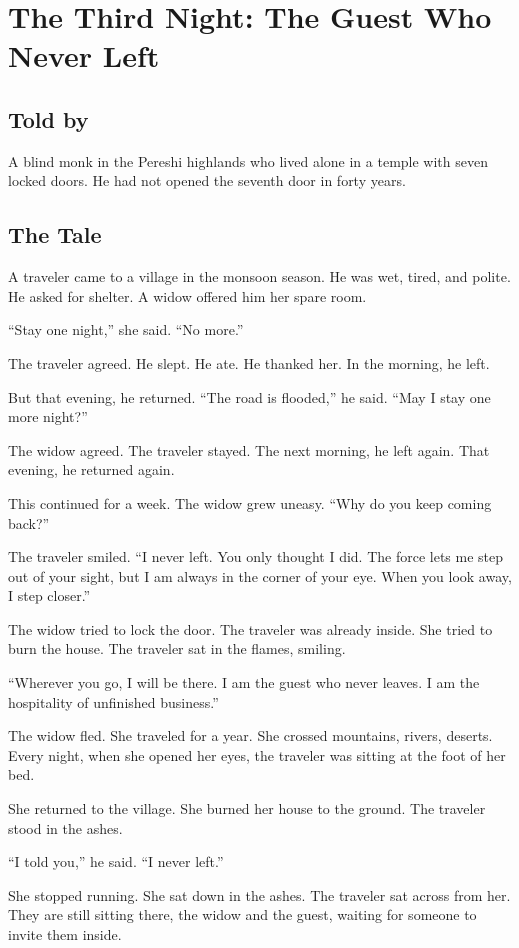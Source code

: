 \documentclass[10pt,twoside]{book}
\begin{document}
\chapter{The Third Night: The Guest Who Never Left}

\section*{Told by}
A blind monk in the Pereshi highlands who lived alone in a temple with seven locked doors. He had not opened the seventh door in forty years.

\section*{The Tale}
A traveler came to a village in the monsoon season. He was wet, tired, and polite. He asked for shelter. A widow offered him her spare room.

``Stay one night,'' she said. ``No more.''

The traveler agreed. He slept. He ate. He thanked her. In the morning, he left.

But that evening, he returned. ``The road is flooded,'' he said. ``May I stay one more night?''

The widow agreed. The traveler stayed. The next morning, he left again. That evening, he returned again.

This continued for a week. The widow grew uneasy. ``Why do you keep coming back?''

The traveler smiled. ``I never left. You only thought I did. The force lets me step out of your sight, but I am always in the corner of your eye. When you look away, I step closer.''

The widow tried to lock the door. The traveler was already inside. She tried to burn the house. The traveler sat in the flames, smiling.

``Wherever you go, I will be there. I am the guest who never leaves. I am the hospitality of unfinished business.''

The widow fled. She traveled for a year. She crossed mountains, rivers, deserts. Every night, when she opened her eyes, the traveler was sitting at the foot of her bed.

She returned to the village. She burned her house to the ground. The traveler stood in the ashes.

``I told you,'' he said. ``I never left.''

She stopped running. She sat down in the ashes. The traveler sat across from her. They are still sitting there, the widow and the guest, waiting for someone to invite them inside.
\end{document}
